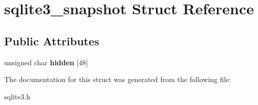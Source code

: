 \hypertarget{structsqlite3__snapshot}{}\section{sqlite3\+\_\+snapshot Struct Reference}
\label{structsqlite3__snapshot}
\subsection*{Public Attributes}
\begin{DoxyCompactItemize}
\item 
\mbox{\label{structsqlite3__snapshot_aeed328b50a9580e9a91d0bf10612be4e}} 
unsigned char {\bfseries hidden} \mbox{[}48\mbox{]}
\end{DoxyCompactItemize}


The documentation for this struct was generated from the following file\+:\begin{DoxyCompactItemize}
\item 
sqlite3.\+h\end{DoxyCompactItemize}
